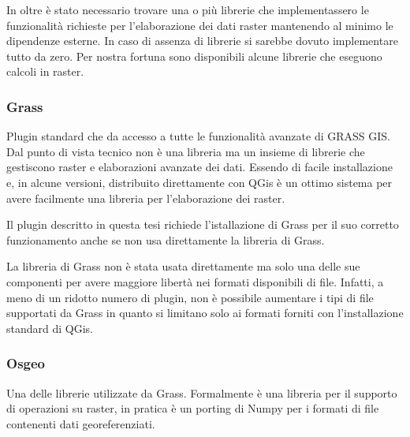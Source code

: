 In oltre è stato necessario trovare una o più librerie che implementassero le funzionalità richieste per l'elaborazione dei dati raster mantenendo al minimo le dipendenze esterne. In caso di assenza di librerie si sarebbe dovuto implementare tutto da zero. Per nostra fortuna sono disponibili alcune librerie che eseguono calcoli in raster.

\subsubsection{Grass}
Plugin standard che da accesso a tutte le funzionalità avanzate di GRASS GIS. Dal punto di vista tecnico non è una libreria ma un insieme di librerie che gestiscono raster e elaborazioni avanzate dei dati. Essendo di facile installazione e, in alcune versioni, distribuito direttamente con QGis è un ottimo sistema per avere facilmente una libreria per l'elaborazione dei raster.

Il plugin descritto in questa tesi richiede l'istallazione di Grass per il suo corretto funzionamento anche se non usa direttamente la libreria di Grass.

La libreria di Grass non è stata usata direttamente ma solo una delle sue componenti per avere maggiore libertà nei formati disponibili di file. Infatti, a meno di un ridotto numero di plugin, non è possibile aumentare i tipi di file supportati da Grass in quanto si limitano solo ai formati forniti con l'installazione standard di QGis.

\subsubsection{Osgeo}
Una delle librerie utilizzate da Grass. Formalmente è una libreria per il supporto di operazioni su raster, in pratica è un porting di Numpy per i formati di file contenenti dati georeferenziati.


